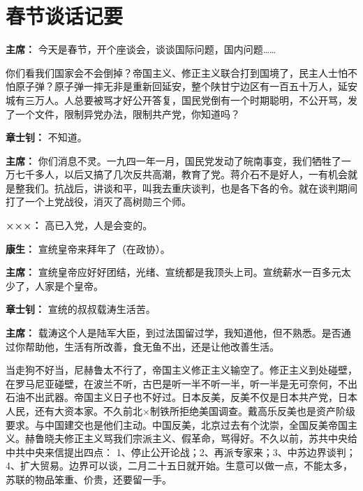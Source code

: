 \section[春节谈话记要（一九六四年二月十三日）]{春节谈话记要}

\begin{duihua}
    
\item[\textbf{主席：}] 今天是春节，开个座谈会，谈谈国际问题，国内问题……

你们看我们国家会不会倒掉？帝国主义、修正主义联合打到国境了，民主人士怕不怕原子弹？原子弹一摔无非是重新回延安，整个陕甘宁边区有一百五十万人，延安城有三万人。人总要被骂才好公开答复，国民党倒有一个时期聪明，不公开骂，发了一个文件，限制异党办法，限制共产党，你知道吗？

\item[\textbf{章士钊：}] 不知道。

\item[\textbf{主席：}] 你们消息不灵。一九四一年一月，国民党发动了皖南事变，我们牺牲了一万七千多人，以后又搞了几次反共高潮，教育了党。蒋介石不是好人，一有机会就是整我们。抗战后，讲谈和平，叫我去重庆谈判，也是各下各的令。就在谈判期间打了一个上党战役，消灭了高树勋三个师。

\item[\textbf{×××：}] 高已入党，人是会变的。

\item[\textbf{康生：}] 宣统皇帝来拜年了（在政协）。

\item[\textbf{主席：}] 宣统皇帝应好好团结，光绪、宣统都是我顶头上司。宣统薪水一百多元太少了，人家是个皇帝。

\item[\textbf{章士钊：}] 宣统的叔叔载涛生活苦。

\item[\textbf{主席：}] 载涛这个人是陆军大臣，到过法国留过学，我知道他，但不熟悉。是否通过你帮助他，生活有所改善，食无鱼不出，还是让他改善生活。

当走狗不好当，尼赫鲁太不行了，帝国主义修正主义输空了。修正主义到处碰壁，在罗马尼亚碰壁，在波兰不听，古巴是听一半不听一半，听一半是无可奈何，不出石油不出武器。帝国主义日子也不好过。日本反美，反美不仅是日本共产党，日本人民，还有大资本家。不久前北×制铁所拒绝美国调查。戴高乐反美也是资产阶级要求。与中国建交也是他们主动。中国反美，北京过去有个沈崇，全国反美帝国主义。赫鲁晓夫修正主义骂我们宗派主义、假革命，骂得好。不久以前，苏共中央给中共中央来信提出四点： 1、停止公开论战；2、再派专家来；3、中苏边界谈判；4、扩大贸易。边界可以谈，二月二十五日就开始。生意可以做一点，不能太多，苏联的物品笨重、价贵，还要留一手。


\end{duihua}

